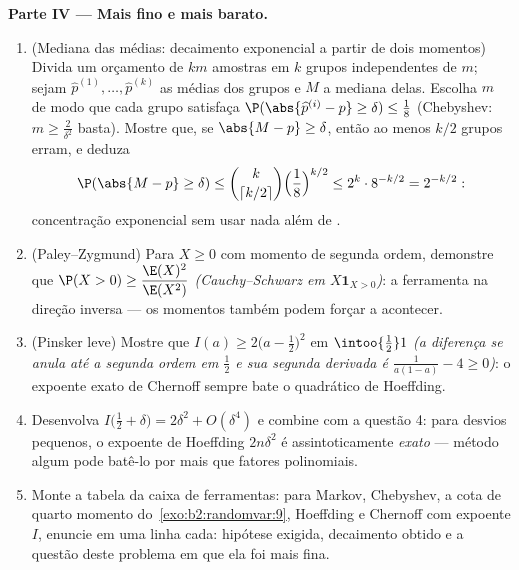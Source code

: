 \begin{problem}
\medskip
\noindent\textbf{Parte IV --- Mais fino e mais barato.}
\begin{enumerate}[resume]
  \item (Mediana das médias: decaimento exponencial a partir de dois momentos)
        Divida um orçamento de $km$ amostras em $k$ grupos
        independentes de $m$; sejam $\widehat p^{(1)}, \dots, \widehat
        p^{(k)}$ as médias dos grupos e $M$ a mediana delas.
        Escolha $m$ de modo que cada grupo satisfaça
        $\P(\abs{\widehat p^{(i)} - p} \geq \delta) \leq
        \frac18$ (Chebyshev: $m \geq \frac2{\delta^2}$
        basta). Mostre que, se $\abs{M - p} \geq \delta$,
        então ao menos $k/2$ grupos erram, e deduza
        \[
        \P(\abs{M - p} \geq \delta)
        \leq \binom{k}{\lceil k/2\rceil}\Bigl(\frac18
        \Bigr)^{k/2}
        \leq 2^k\cdot 8^{-k/2} = 2^{-k/2} :
        \]
        concentração exponencial sem usar nada além de
        .
  \item (Paley--Zygmund) Para $X \geq 0$ com momento de segunda ordem,
        demonstre que $\P(X > 0) \geq \dfrac{\E(X)^2}{\E(X^2)}$
        \emph{(Cauchy--Schwarz em $X\mathbf 1_{X>0}$)}: a
        ferramenta na direção inversa --- os momentos também podem forçar
         a acontecer.
  \item (Pinsker leve) Mostre que $I(a) \geq 2\bigl(a -
        \tfrac12\bigr)^2$ em $\intoo{\frac12}1$ \emph{(a
        diferença se anula até a segunda ordem em $\frac12$ e
        sua segunda derivada é $\frac1{a(1-a)} - 4 \geq
        0$)}: o expoente exato de Chernoff sempre bate o
        quadrático de Hoeffding.
  \item Desenvolva $I\bigl(\tfrac12 + \delta\bigr) = 2\delta^2 +
        O(\delta^4)$ e combine com a questão 4: para desvios
        pequenos, o expoente de Hoeffding $2n\delta^2$ é
        assintoticamente \emph{exato} --- método algum pode batê-lo
        por mais que fatores polinomiais.
  \item Monte a tabela da caixa de ferramentas: para Markov, Chebyshev, a
        cota de quarto momento do~\cref{exo:b2:randomvar:9},
        Hoeffding e Chernoff com expoente $I$, enuncie em
        uma linha cada: hipótese exigida, decaimento obtido
        e a questão deste problema em que ela foi
        mais fina.
\end{enumerate}


\end{problem}
